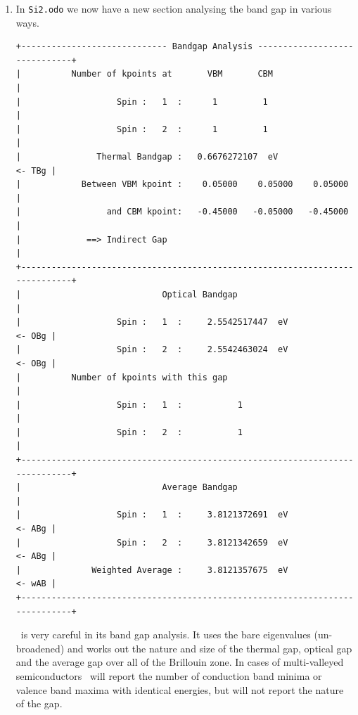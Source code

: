 \documentclass[a4paper,11pt,twoside]{book}
\begin{document}
{\begin{enumerate}
\verb#$ mpirun -np <nprocs> optados.SYSTEM.BUILD.COMMS_ARCH.x86_64 Si2# 

but your MPI implementation may be different.

\item In  \verb#Si2.odo# we now have a new section analysing the band gap in various ways.
\begin{verbatim}
+----------------------------- Bandgap Analysis ------------------------------+
|          Number of kpoints at       VBM       CBM                           |
|                   Spin :   1  :      1         1                            |
|                   Spin :   2  :      1         1                            |
|               Thermal Bandgap :   0.6676272107  eV                   <- TBg |
|            Between VBM kpoint :    0.05000    0.05000    0.05000            |
|                 and CBM kpoint:   -0.45000   -0.05000   -0.45000            |
|             ==> Indirect Gap                                                |
+-----------------------------------------------------------------------------+
|                            Optical Bandgap                                  |
|                   Spin :   1  :     2.5542517447  eV                 <- OBg |
|                   Spin :   2  :     2.5542463024  eV                 <- OBg |
|          Number of kpoints with this gap                                    |
|                   Spin :   1  :           1                                 |
|                   Spin :   2  :           1                                 |
+-----------------------------------------------------------------------------+
|                            Average Bandgap                                  |
|                   Spin :   1  :     3.8121372691  eV                 <- ABg |
|                   Spin :   2  :     3.8121342659  eV                 <- ABg |
|              Weighted Average :     3.8121357675  eV                 <- wAB |
+-----------------------------------------------------------------------------+
\end{verbatim}

\optados\ is very careful in its band gap analysis. It uses the bare eigenvalues (un-broadened) and works out the nature and size of the thermal gap, optical gap and the average gap over all of the Brillouin zone. In cases of multi-valleyed semiconductors \optados\ will report the number of conduction band minima or valence band maxima with identical energies, but will not report the nature of the gap. 


\end{enumerate}}
\end{document}
